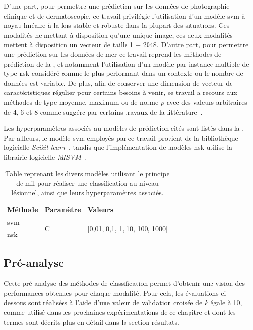 D'une part, pour permettre une prédiction sur les données de photographie clinique et de dermatoscopie, ce travail privilégie l'utilisation d'un modèle \gls{svm} à noyau linéaire à la fois stable et robuste dans la plupart des situations. Ces modalités ne mettant à disposition qu’une unique image, ces deux modalités mettent à disposition un vecteur de taille 1 $\pm$ 2048. D'autre part, pour permettre une prédiction sur les données de \gls{mcr} ce travail reprend les méthodes de prédiction de la , et notamment l'utilisation d'un modèle par instance multiple de type \gls{nsk} considéré comme le plus performant dans un contexte ou le nombre de données est variable. De plus, afin de conserver une dimension de vecteur de caractéristiques régulier pour certains besoins à venir, ce travail a recours aux méthodes de type moyenne, maximum ou de norme $p$ avec des valeurs arbitraires de 4, 6 et 8 comme suggéré par certains travaux de la littérature~\cite{Li2016,Xu2017}.\par

Les hyperparamètres associés au modèles de prédiction cités sont listés dans la . Par ailleurs, le modèle \gls{svm} employés par ce travail provient de la bibliothèque logicielle \textit{Scikit-learn}~\cite{pedregosa2011}, tandis que l'implémentation de modèles \gls{nsk} utilise la librairie logicielle \textit{MISVM}~\cite{Doran2013}.\par
\begin{table}[H]
    \centering
    \begin{tabular}{lll}
    \toprule
    \textbf{Méthode}    & \textbf{Paramètre}& \textbf{Valeurs}                                  \\ \midrule
    \gls{svm}           & \multirow{2}{*}{C}& \multirow{2}{*}{[0,01, 0,1, 1, 10, 100, 1000]}    \\ \cline{1-1}
    \gls{nsk}           &                   &                                                   \\ \bottomrule 
    \end{tabular}    
    \caption{Table reprenant les divers modèles utilisant le principe de \gls{mil} pour réaliser une classification au niveau lésionnel, ainsi que leurs hyperparamètres associés.}
    \label{tab:multimodal_models_parameters}
\end{table}\par
\clearpage

\subsection{Pré-analyse}
Cette pré-analyse des méthodes de classification permet d'obtenir une vision des performances obtenues pour chaque modalité. Pour cela, les évaluations ci-dessous sont réalisées à l'aide d'une valeur de validation croisée de $k$ égale à 10, comme utilisé dans les prochaines expérimentations de ce chapitre et dont les termes sont décrits plus en détail dans la section résultats.\par

